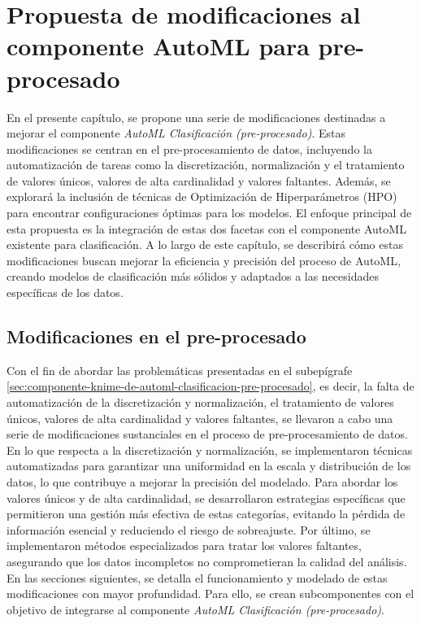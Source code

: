 \chapter{Propuesta de modificaciones al componente AutoML para pre-procesado}\label{chap:2}
En el presente capítulo, se propone una serie de modificaciones destinadas a mejorar el componente \emph{AutoML Clasificación (pre-procesado)}. Estas modificaciones se centran en el pre-procesamiento de datos, incluyendo la automatización de tareas como la discretización, normalización y el tratamiento de valores únicos, valores de alta cardinalidad y valores faltantes. Además, se explorará la inclusión de técnicas de Optimización de Hiperparámetros (HPO) para encontrar configuraciones óptimas para los modelos. El enfoque principal de esta propuesta es la integración de estas dos facetas con el componente AutoML existente para clasificación. A lo largo de este capítulo, se describirá cómo estas modificaciones buscan mejorar la eficiencia y precisión del proceso de AutoML, creando modelos de clasificación más sólidos y adaptados a las necesidades específicas de los datos.

\section{Modificaciones en el pre-procesado}
Con el fin de abordar las problemáticas presentadas en el subepígrafe \ref{sec:componente-knime-de-automl-clasificacion-pre-procesado}, es decir, la falta de automatización de la discretización y normalización, el tratamiento de valores únicos, valores de alta cardinalidad y valores faltantes, se llevaron a cabo una serie de modificaciones sustanciales en el proceso de pre-procesamiento de datos. \\
 En lo que respecta a la discretización y normalización, se implementaron técnicas automatizadas para garantizar una uniformidad en la escala y distribución de los datos, lo que contribuye a mejorar la precisión del modelado. Para abordar los valores únicos y de alta cardinalidad, se desarrollaron estrategias específicas que permitieron una gestión más efectiva de estas categorías, evitando la pérdida de información esencial y reduciendo el riesgo de sobreajuste. Por último, se implementaron métodos especializados para tratar los valores faltantes, asegurando que los datos incompletos no comprometieran la calidad del análisis. En las secciones siguientes, se detalla el funcionamiento y modelado de estas modificaciones con mayor profundidad. Para ello, se crean subcomponentes con el objetivo de integrarse al componente\textit{ AutoML Clasificación (pre-procesado)}.

